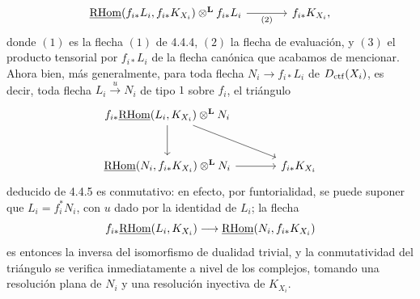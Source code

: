 \begin{prooftext}[Demostración]
\begin{equation}
\begin{tikzcd}[column sep=large,row sep=large]
\uRHom(f_{i*}L_i,f_{i*}K_{X_i})\otimes^{\mathbf L} f_{i*}L_i
 \arrow[r,"(2)"'] &
f_{i*}K_{X_i},
\end{tikzcd}
\end{equation}
donde $(1)$ es la flecha $(1)$ de 4.4.4, $(2)$ la flecha de evaluación, y $(3)$ el producto tensorial por $f_{i*}L_i$ de la flecha canónica que acabamos de mencionar. Ahora bien, más generalmente, para toda flecha $N_i\longrightarrow f_{i*}L_i$ de $D_{\mathrm{ctf}}(X_i)$, es decir, toda flecha $L_i\xrightarrow{u}N_i$ de tipo $1$ sobre $f_i$, el triángulo
\[
\begin{tikzcd}[column sep=large,row sep=large]
f_{i*}\uRHom(L_i,K_{X_i})\otimes^{\mathbf L}N_i
 \arrow[dr] \arrow[d] & \\
\uRHom(N_i,f_{i*}K_{X_i})\otimes^{\mathbf L}N_i \arrow[r] &
f_{i*}K_{X_i}
\end{tikzcd}
\]
deducido de 4.4.5 es conmutativo: en efecto, por funtorialidad, se puede suponer que $L_i=f_i^*N_i$, con $u$ dado por la identidad de $L_i$; la flecha
\[
f_{i*}\underline{\mathrm{RHom}}(L_i,K_{X_i})\longrightarrow\underline{\mathrm{RHom}}(N_i,f_{i*}K_{X_i})
\]
es entonces la inversa del isomorfismo de dualidad trivial, y la conmutatividad del triángulo se verifica inmediatamente a nivel de los complejos, tomando una resolución plana de $N_i$ y una resolución inyectiva de $K_{X_i}$.


\end{prooftext}
